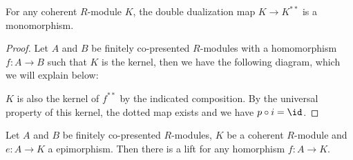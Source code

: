 \begin{lemma}
  \label{coherent-double-dual-mono}
  For any coherent $R$-module $K$, the double dualization map $K\to K^{\ast\ast}$ is a monomorphism.
\end{lemma}

\begin{proof}
  Let $A$ and $B$ be finitely co-presented $R$-modules with a homomorphism $f:A\to B$ such that $K$ is the kernel, then we have the following diagram, which we will explain below:
\begin{center}
\end{center}
$K$ is also the kernel of $f^{\ast\ast}$ by the indicated composition.
By the universal property of this kernel, the dotted map exists and we have $p\circ i=\id$.
\end{proof}

\begin{lemma}
  \label{maps-into-coherent-lift}
  Let $A$ and $B$ be finitely co-presented $R$-modules, $K$ be a coherent $R$-module and $e:A\to K$ a epimorphism.
  Then there is a lift for any homorphism $f:A\to K$.
    \begin{center}
    \end{center}
\end{lemma}

